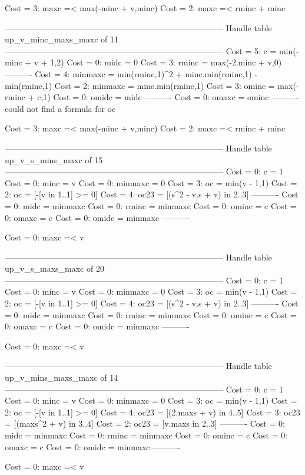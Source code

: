 Cost =  3:  maxc =< max(-minc + v,minc)
Cost =  2:  maxc =< rminc + minc

--------------------------------------------------------------------------------
Handle table up_v_minc_maxs_maxc of 11
--------------------------------------------------------------------------------
Cost =  5:  c       = min(-minc + v + 1,2)
Cost =  0:  midc    = 0
Cost =  3:  rminc   = max(-2.minc + v,0)
----------
Cost =  4:  minmaxc = min(rminc,1)^2 + minc.min(rminc,1) - min(rminc,1)
Cost =  2:  minmaxc = minc.min(rminc,1)
Cost =  3:  ominc   = max(-rminc + c,1)
Cost =  0:  omidc   = midc
----------
Cost =  0:  omaxc   = ominc
----------
could not find a formula for oc

Cost =  3:  maxc =< max(-minc + v,minc)
Cost =  2:  maxc =< rminc + minc

--------------------------------------------------------------------------------
Handle table up_v_s_mins_maxc of 15
--------------------------------------------------------------------------------
Cost =  0:  c       = 1
Cost =  0:  minc    = v
Cost =  0:  minmaxc = 0
Cost =  3:  oc      = min(v - 1,1)
Cost =  2:  oc      = [-[v in 1..1] >= 0]
Cost =  4:  oc23    = [(s^2 - v.s + v) in 2..3]
----------
Cost =  0:  midc    = minmaxc
Cost =  0:  rminc   = minmaxc
Cost =  0:  ominc   = c
Cost =  0:  omaxc   = c
Cost =  0:  omidc   = minmaxc
----------

Cost =  0:  maxc =< v

--------------------------------------------------------------------------------
Handle table up_v_s_maxs_maxc of 20
--------------------------------------------------------------------------------
Cost =  0:  c       = 1
Cost =  0:  minc    = v
Cost =  0:  minmaxc = 0
Cost =  3:  oc      = min(v - 1,1)
Cost =  2:  oc      = [-[v in 1..1] >= 0]
Cost =  4:  oc23    = [(s^2 - v.s + v) in 2..3]
----------
Cost =  0:  midc    = minmaxc
Cost =  0:  rminc   = minmaxc
Cost =  0:  ominc   = c
Cost =  0:  omaxc   = c
Cost =  0:  omidc   = minmaxc
----------

Cost =  0:  maxc =< v

--------------------------------------------------------------------------------
Handle table up_v_mins_maxs_maxc of 14
--------------------------------------------------------------------------------
Cost =  0:  c       = 1
Cost =  0:  minc    = v
Cost =  0:  minmaxc = 0
Cost =  3:  oc      = min(v - 1,1)
Cost =  2:  oc      = [-[v in 1..1] >= 0]
Cost =  4:  oc23    = [(2.maxs + v) in 4..5]
Cost =  3:  oc23    = [(maxs^2 + v) in 3..4]
Cost =  2:  oc23    = [v.maxs in 2..3]
----------
Cost =  0:  midc    = minmaxc
Cost =  0:  rminc   = minmaxc
Cost =  0:  ominc   = c
Cost =  0:  omaxc   = c
Cost =  0:  omidc   = minmaxc
----------

Cost =  0:  maxc =< v
